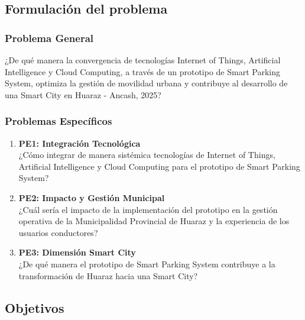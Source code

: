 \documentclass[12pt,a4paper]{article}
\begin{document}
\subsection{Formulación del problema}
\newcommand{\problemaGeneral}{¿De qué manera la convergencia de tecnologías Internet of Things, Artificial Intelligence y Cloud Computing, a través de un prototipo de Smart Parking System, optimiza la gestión de movilidad urbana y contribuye al desarrollo de una Smart City en Huaraz - Ancash, 2025?}

\newcommand{\problemaEspecificoUno}{¿Cómo integrar de manera sistémica tecnologías de Internet of Things, Artificial Intelligence y Cloud Computing para el prototipo de Smart Parking System?}

\newcommand{\problemaEspecificoDos}{¿Cuál sería el impacto de la implementación del prototipo en la gestión operativa de la Municipalidad Provincial de Huaraz y la experiencia de los usuarios conductores?}

\newcommand{\problemaEspecificoTres}{¿De qué manera el prototipo de Smart Parking System contribuye a la transformación de Huaraz hacia una Smart City?}
    
\subsubsection{Problema General}
\problemaGeneral{}

\subsubsection{Problemas Específicos}
\begin{enumerate}
	\item \textbf{PE1: Integración Tecnológica}\\
    \problemaEspecificoUno{}
    
    \item \textbf{PE2: Impacto y Gestión Municipal}\\
    \problemaEspecificoDos{}
    
    \item \textbf{PE3: Dimensión Smart City}\\
    \problemaEspecificoTres{}
\end{enumerate}

\subsection{Objetivos}
\newcommand{\objetivoGeneral}{Desarrollar un prototipo de Smart Parking System basado en la convergencia de tecnologías Internet of Things, Artificial Intelligence y Cloud Computing, que optimice la gestión de movilidad urbana y contribuya al desarrollo de una Smart City en Huaraz - Ancash, 2025.}
\end{document}
